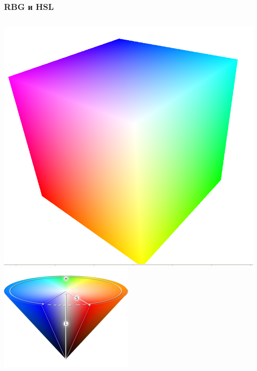 \documentclass[24pt,pdf,hyperref={unicode},aspectratio=169]{beamer}
\begin{document}
\begin{frame}\frametitle{RBG и HSL}
\begin{columns}
  \includegraphics[width=\textwidth]{Images/RGB.png} 
  \includegraphics[width=\textwidth]{Images/HSL.jpg} 
\end{columns}
\end{frame}
\end{document}
